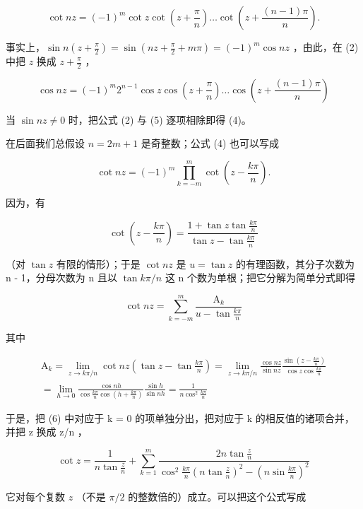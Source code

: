 \[
\cot n z = (- 1) ^ {m} \cot z \cot \left(z + \frac {\pi}{n}\right) \dots \cot \left(z + \frac {(n - 1) \pi}{n}\right).\tag{4}
\]

事实上，\(\sin n\left(z + \frac{\pi}{2}\right) = \sin \left(nz + \frac{\pi}{2} + m\pi\right) = (-1)^m\cos nz\) ，由此，在 (2) 中把 \(z\) 换成 \(z + \frac{\pi}{2}\) ，

\[
\cos n z = (- 1) ^ {m} 2 ^ {n - 1} \cos z \cos \left(z + \frac {\pi}{n}\right) \dots \cos \left(z + \frac {(n - 1) \pi}{n}\right)\tag{5}
\]

当 \(\sin nz \neq 0\) 时，把公式 (2) 与 (5) 逐项相除即得 (4)。

在后面我们总假设 \(n = 2m + 1\) 是奇整数；公式 (4) 也可以写成

\[
\cot n z = (- 1) ^ {m} \prod_ {k = - m} ^ {m} \cot \left(z - \frac {k \pi}{n}\right).
\]

因为，有

\[
\cot \left(z - \frac {k \pi}{n}\right) = \frac {1 + \tan z \tan \frac {k \pi}{n}}{\tan z - \tan \frac {k \pi}{n}}
\]

（对 \(\tan z\) 有限的情形）；于是 \(\cot nz\) 是 \(u = \tan z\) 的有理函数，其分子次数为 n - 1，分母次数为 n 且以 \(\tan k\pi/n\) 这 n 个数为单根；把它分解为简单分式即得

\[
\cot n z = \sum_ {k = - m} ^ {m} \frac {\mathrm{A} _ {k}}{u - \tan \frac {k \pi}{n}}\tag{6}
\]

其中

\[
\begin{array}{l}\mathrm{A} _ {k} = \lim _ {z \rightarrow k \pi / n} \cot n z \left(\tan z - \tan \frac {k \pi}{n}\right) = \lim _ {z \rightarrow k \pi / n} \frac {\cos n z}{\sin n z} \frac {\sin \left(z - \frac {k \pi}{n}\right)}{\cos z \cos \frac {k \pi}{n}}\\= \lim _ {h \rightarrow 0} \frac {\cos n h}{\cos \frac {k \pi}{n} \cos \left(h + \frac {k \pi}{n}\right)} \frac {\sin h}{\sin n h} = \frac {1}{n \cos^ {2} \frac {k \pi}{n}}\end{array}
\]

于是，把 (6) 中对应于 k = 0 的项单独分出，把对应于 k 的相反值的诸项合并，并把 z 换成 z/n ，

\[
\cot z = \frac {1}{n \tan \frac {z}{n}} + \sum_ {k = 1} ^ {m} \frac {2 n \tan \frac {z}{n}}{\cos^ {2} \frac {k \pi}{n} \left(n \tan \frac {z}{n}\right) ^ {2} - \left(n \sin \frac {k \pi}{n}\right) ^ {2}}\tag{7}
\]

它对每个复数 \(z\) （不是 \(\pi / 2\) 的整数倍的）成立。可以把这个公式写成

